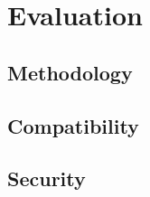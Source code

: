 \section{Evaluation}
\label{sec:evaluation}

\subsection{Methodology}

\subsection{Compatibility}

\subsection{Security}
